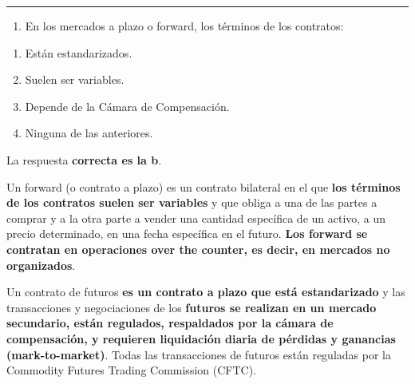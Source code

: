 \documentclass[
  letterpaper,
  DIV=11,
  numbers=noendperiod]{scrreprt}
\providecommand{\tightlist}{%
  \setlength{\itemsep}{0pt}\setlength{\parskip}{0pt}}\usepackage{longtable,booktabs,array}
\begin{document}
\begin{center}\rule{0.5\linewidth}{0.5pt}\end{center}

\begin{enumerate}
\def\labelenumi{\arabic{enumi}.}
\setcounter{enumi}{34}
\tightlist
\item
  En los mercados a plazo o forward, los términos de los contratos:
\end{enumerate}

\begin{enumerate}
\def\labelenumi{\alph{enumi})}
\item
  Están estandarizados.
\item
  Suelen ser variables.
\item
  Depende de la Cámara de Compensación.
\item
  Ninguna de las anteriores.
\end{enumerate}

\begin{tcolorbox}[enhanced jigsaw, left=2mm, opacityback=0, colback=white, breakable, arc=.35mm, bottomrule=.15mm, rightrule=.15mm, toprule=.15mm, leftrule=.75mm, colframe=quarto-callout-tip-color-frame]
\begin{minipage}[t]{5.5mm}
\textcolor{quarto-callout-tip-color}{\faLightbulb}
\end{minipage}%
\begin{minipage}[t]{\textwidth - 5.5mm}

La respuesta \textbf{correcta es la b}.

Un forward (o contrato a plazo) es un contrato bilateral en el que
\textbf{los términos de los contratos suelen ser variables} y que obliga
a una de las partes a comprar y a la otra parte a vender una cantidad
específica de un activo, a un precio determinado, en una fecha
específica en el futuro. \textbf{Los forward se contratan en operaciones
over the counter, es decir, en mercados no organizados}.

Un contrato de futuros \textbf{es un contrato a plazo que está
estandarizado} y las transacciones y negociaciones de los
\textbf{futuros se realizan en un mercado secundario, están regulados,
respaldados por la cámara de compensación, y requieren liquidación
diaria de pérdidas y ganancias (mark-to-market)}. Todas las
transacciones de futuros están reguladas por la Commodity Futures
Trading Commission (CFTC).

\end{minipage}%
\end{tcolorbox}
\end{document}
